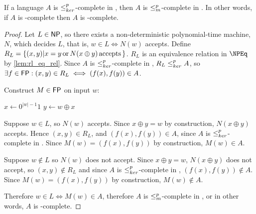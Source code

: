 

\begin{theorem}\label{thm:krc_npc}If a language $A$ is $\leq^{p}_{ker}$-complete in \NPEq,
  then $A$ is $\leq^{p}_{m}$-complete in \NP. In other words, if $A$ is \NPEq-complete
  then $A$ is \NP-complete.\end{theorem}
\begin{proof}
  Let $L\in{\ensuremath{\mathsf{NP}}}$, so there exists a non-deterministic polynomial-time machine,
  $N$, which decides $L$, that is, $w\in L\iff N(w)$ accepts. Define
  $R_L=\{(x,y)|x=y \,\text{or}\, N(x\oplus y) \,\text{accepts}\,\}$. $R_L$ is an
  equivalence relation in $\NPEq$ by \autoref{lem:rl_eq_rel}. Since $A$ is
  $\leq^{p}_{ker}$-complete in \NPEq, $R_L\leq^{p}_{ker} A$, so $\exists f\in{\ensuremath{\mathsf{FP}}}:(x,y)\in R_L\iff
  (f(x), f(y))\in A$.

  Construct $M\in{\ensuremath{\mathsf{FP}}}$ on input $w$:\\
  \begin{algorithm}[H]
    $x\gets0^{|w|-1}1$\;
    $y\gets w\oplus x$\;
  \end{algorithm}

  Suppose $w\in L$, so $N(w)$ accepts. Since $x\oplus y=w$ by construction,
  $N(x\oplus y)$ accepts. Hence $(x,y)\in R_L$, and $(f(x),f(y))\in A$, since
  $A$ is $\leq^{p}_{ker}$-complete in \NPEq. Since $M(w)=(f(x),f(y))$ by construction,
  $M(w)\in A$.
  
  Suppose $w\notin L$ so $N(w)$ does not accept. Since $x\oplus y=w$,
  $N(x\oplus y)$ does not accept, so $(x,y)\notin R_L$ and since $A$ is
  $\leq^{p}_{ker}$-complete in \NPEq, $(f(x), f(y))\notin A$. Since $M(w)=(f(x),f(y))$ by
  construction, $M(w)\notin A$.

  Therefore $w\in L\iff M(w)\in A$, therefore $A$ is $\leq^{p}_{m}$-complete in \NP,
  or in other words, $A$ is \NP-complete.
\end{proof}

